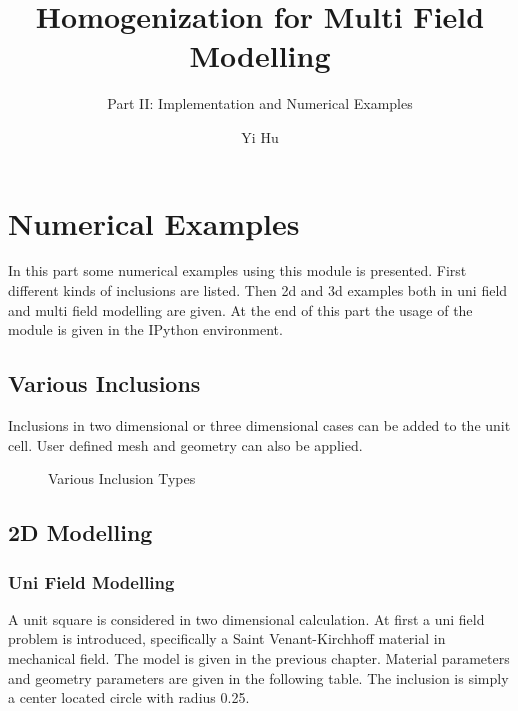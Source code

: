 \documentclass[10pt,a4paper]{scrreprt}
\author{Yi Hu}
\title{Homogenization for Multi Field Modelling}
\subtitle{Part II: Implementation and Numerical Examples}
\begin{document}
\chapter{Numerical Examples}
In this part some numerical examples using this module is presented. First different kinds of inclusions are listed. Then 2d and 3d examples both in uni field and multi field modelling are given. At the end of this part the usage of the module is given in the IPython environment.

\section{Various Inclusions}
Inclusions in two dimensional or three dimensional cases can be added to the unit cell. User defined mesh and geometry can also be applied.

\begin{figure}[h]
  \centering
  \caption{Various Inclusion Types}
  \label{fig: inc} %
\end{figure} 

\section{2D Modelling}
\subsection{Uni Field Modelling}
A unit square is considered in two dimensional calculation. At first a uni field problem is introduced, specifically a Saint Venant-Kirchhoff material in mechanical field. The model is given in the previous chapter. Material parameters and geometry parameters are given in the following table. The inclusion is simply a center located circle with radius 0.25. \\
\end{document}
